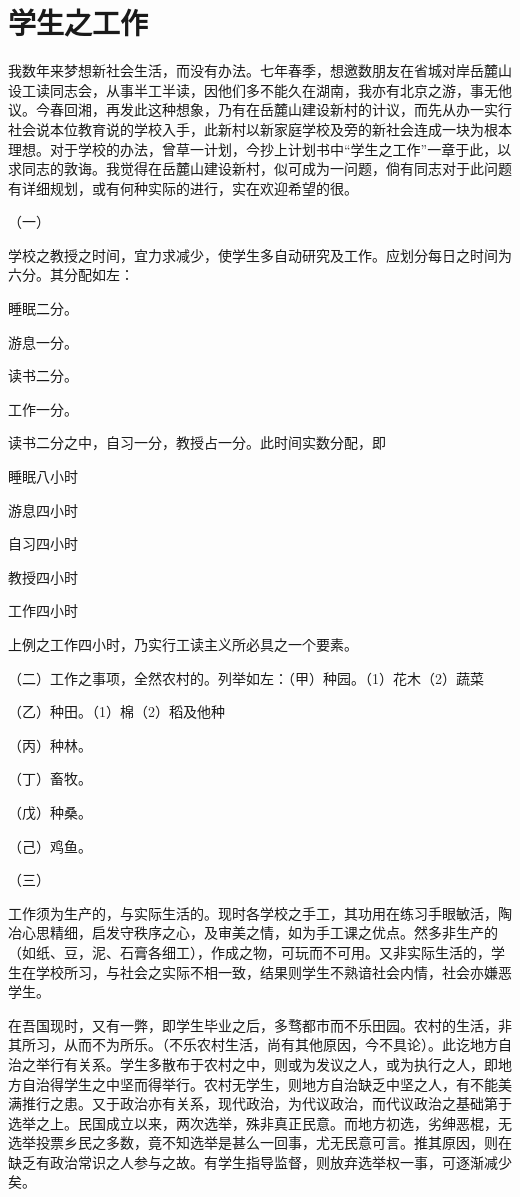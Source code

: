 \section{学生之工作}



我数年来梦想新社会生活，而没有办法。七年春季，想邀数朋友在省城对岸岳麓山设工读同志会，从事半工半读，因他们多不能久在湖南，我亦有北京之游，事无他议。今春回湘，再发此这种想象，乃有在岳麓山建设新村的计议，而先从办一实行社会说本位教育说的学校入手，此新村以新家庭学校及旁的新社会连成一块为根本理想。对于学校的办法，曾草一计划，今抄上计划书中“学生之工作”一章于此，以求同志的敦诲。我觉得在岳麓山建设新村，似可成为一问题，倘有同志对于此问题有详细规划，或有何种实际的进行，实在欢迎希望的很。

（一）

学校之教授之时间，宜力求减少，使学生多自动研究及工作。应划分每日之时间为六分。其分配如左：

睡眠二分。

游息一分。

读书二分。

工作一分。

读书二分之中，自习一分，教授占一分。此时间实数分配，即

睡眠八小时

游息四小时

自习四小时

教授四小时

工作四小时

上例之工作四小时，乃实行工读主义所必具之一个要素。

（二）工作之事项，全然农村的。列举如左：（甲）种园。（1）花木（2）蔬菜

（乙）种田。（1）棉（2）稻及他种

（丙）种林。

（丁）畜牧。

（戊）种桑。

（己）鸡鱼。

（三）

工作须为生产的，与实际生活的。现时各学校之手工，其功用在练习手眼敏活，陶冶心思精细，启发守秩序之心，及审美之情，如为手工课之优点。然多非生产的（如纸、豆，泥、石膏各细工），作成之物，可玩而不可用。又非实际生活的，学生在学校所习，与社会之实际不相一致，结果则学生不熟谙社会内情，社会亦嫌恶学生。

在吾国现时，又有一弊，即学生毕业之后，多骛都市而不乐田园。农村的生活，非其所习，从而不为所乐。（不乐农村生活，尚有其他原因，今不具论）。此讫地方自治之举行有关系。学生多散布于农村之中，则或为发议之人，或为执行之人，即地方自治得学生之中坚而得举行。农村无学生，则地方自治缺乏中坚之人，有不能美满推行之患。又于政治亦有关系，现代政治，为代议政治，而代议政治之基础第于选举之上。民国成立以来，两次选举，殊非真正民意。而地方初选，劣绅恶棍，无选举投票乡民之多数，竟不知选举是甚么一回事，尤无民意可言。推其原因，则在缺乏有政治常识之人参与之故。有学生指导监督，则放弃选举权一事，可逐渐减少矣。

